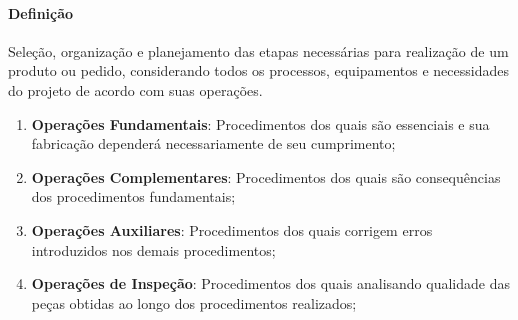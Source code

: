 \documentclass{article}
\begin{document}
        \paragraph{Definição}Seleção, organização e planejamento das etapas necessárias para realização de um produto ou pedido, considerando todos os processos, equipamentos e necessidades do projeto de acordo com suas operações.
            \begin{enumerate}[rightmargin = \leftmargin]
                \item \textbf{Operações Fundamentais}: Procedimentos dos quais são essenciais e sua fabricação dependerá necessariamente de seu cumprimento;
                \item \textbf{Operações Complementares}: Procedimentos dos quais são consequências dos procedimentos fundamentais;
                \item \textbf{Operações Auxiliares}: Procedimentos dos quais corrigem erros introduzidos nos demais procedimentos;
                \item \textbf{Operações de Inspeção}: Procedimentos dos quais analisando qualidade das peças obtidas ao longo dos procedimentos realizados;
            \end{enumerate}
\end{document}
